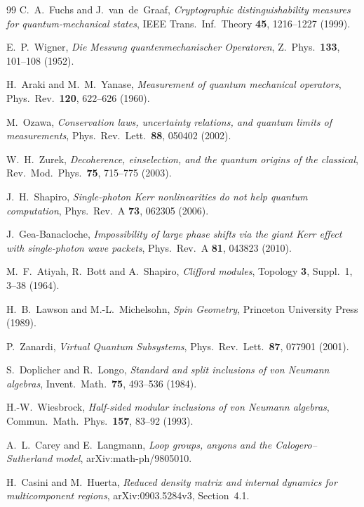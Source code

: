 \begin{thebibliography}{99}
C.~A.~Fuchs and J.~van~de~Graaf, \emph{Cryptographic distinguishability measures for quantum-mechanical states}, IEEE Trans.\ Inf.\ Theory \textbf{45}, 1216--1227 (1999).

E.~P.~Wigner, \emph{Die Messung quantenmechanischer Operatoren}, Z.\ Phys.\ \textbf{133}, 101--108 (1952).

H.~Araki and M.~M.~Yanase, \emph{Measurement of quantum mechanical operators}, Phys.\ Rev.\ \textbf{120}, 622--626 (1960).

M.~Ozawa, \emph{Conservation laws, uncertainty relations, and quantum limits of measurements}, Phys.\ Rev.\ Lett.\ \textbf{88}, 050402 (2002).

W.~H.~Zurek, \emph{Decoherence, einselection, and the quantum origins of the classical}, Rev.\ Mod.\ Phys.\ \textbf{75}, 715--775 (2003).

J.~H.~Shapiro, \emph{Single-photon Kerr nonlinearities do not help quantum computation}, Phys.\ Rev.\ A \textbf{73}, 062305 (2006).

J.~Gea-Banacloche, \emph{Impossibility of large phase shifts via the giant Kerr effect with single-photon wave packets}, Phys.\ Rev.\ A \textbf{81}, 043823 (2010).

M.~F.~Atiyah, R.~Bott and A.~Shapiro, \emph{Clifford modules}, Topology \textbf{3}, Suppl.~1, 3--38 (1964).

H.~B.~Lawson and M.-L.~Michelsohn, \emph{Spin Geometry}, Princeton University Press (1989).

P.~Zanardi, \emph{Virtual Quantum Subsystems}, Phys.\ Rev.\ Lett.\ \textbf{87}, 077901 (2001).

S.~Doplicher and R.~Longo, \emph{Standard and split inclusions of von Neumann algebras}, Invent.\ Math.\ \textbf{75}, 493--536 (1984).

H.-W.~Wiesbrock, \emph{Half-sided modular inclusions of von Neumann algebras}, Commun.\ Math.\ Phys.\ \textbf{157}, 83--92 (1993).

A.~L.~Carey and E.~Langmann,
\emph{Loop groups, anyons and the Calogero--Sutherland model},
arXiv:math-ph/9805010.

H.~Casini and M.~Huerta,
\emph{Reduced density matrix and internal dynamics for multicomponent regions},
arXiv:0903.5284v3, Section~4.1.


\end{thebibliography}

